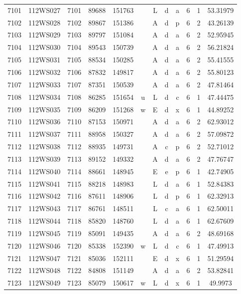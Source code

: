 \begin{tabular}{|*{12}{c|}}
7101 & 112WS027 & 7101 & 89688 & 151763 &  & L & d & a & 6 & 1 & 53.31979 \\ 
7102 & 112WS028 & 7102 & 89867 & 151386 &  & A & d & p & 6 & 2 & 43.26139 \\ 
7103 & 112WS029 & 7103 & 89797 & 151084 &  & A & d & a & 6 & 2 & 52.95945 \\ 
7104 & 112WS030 & 7104 & 89543 & 150739 &  & A & d & a & 6 & 2 & 56.21824 \\ 
7105 & 112WS031 & 7105 & 88534 & 150285 &  & A & d & a & 6 & 2 & 55.41555 \\ 
7106 & 112WS032 & 7106 & 87832 & 149817 &  & A & d & a & 6 & 2 & 55.80123 \\ 
7107 & 112WS033 & 7107 & 87351 & 150539 &  & A & d & a & 6 & 2 & 47.81464 \\ 
7108 & 112WS034 & 7108 & 86285 & 151654 & u & L & d & c & 6 & 1 & 47.44475 \\ 
7109 & 112WS035 & 7109 & 86209 & 151268 & w & E & d & x & 6 & 1 & 44.89252 \\ 
7110 & 112WS036 & 7110 & 87153 & 150971 &  & A & d & a & 6 & 2 & 62.93012 \\ 
7111 & 112WS037 & 7111 & 88958 & 150327 &  & A & d & a & 6 & 2 & 57.09872 \\ 
7112 & 112WS038 & 7112 & 88935 & 149731 &  & A & c & p & 6 & 2 & 52.71012 \\ 
7113 & 112WS039 & 7113 & 89152 & 149332 &  & A & d & a & 6 & 2 & 47.76747 \\ 
7114 & 112WS040 & 7114 & 88661 & 148945 &  & E & e & p & 6 & 1 & 42.74905 \\ 
7115 & 112WS041 & 7115 & 88218 & 148983 &  & L & d & a & 6 & 1 & 52.84383 \\ 
7116 & 112WS042 & 7116 & 87611 & 148906 &  & L & d & p & 6 & 1 & 62.32913 \\ 
7117 & 112WS043 & 7117 & 86761 & 148511 &  & L & c & a & 6 & 1 & 62.50011 \\ 
7118 & 112WS044 & 7118 & 85820 & 148760 &  & L & d & a & 6 & 1 & 62.67609 \\ 
7119 & 112WS045 & 7119 & 85091 & 149435 &  & A & d & a & 6 & 2 & 48.69168 \\ 
7120 & 112WS046 & 7120 & 85338 & 152390 & w & L & d & c & 6 & 1 & 47.49913 \\ 
7121 & 112WS047 & 7121 & 85036 & 152111 &  & E & d & x & 6 & 1 & 51.29594 \\ 
7122 & 112WS048 & 7122 & 84808 & 151149 &  & A & d & a & 6 & 2 & 53.82841 \\ 
7123 & 112WS049 & 7123 & 85079 & 150617 & w & L & d & x & 6 & 1 & 49.9973 \\ 

\end{tabular}

